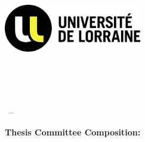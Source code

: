 \begin{titlepage}
    \begin{addmargin}[-1cm]{-3cm}
    \begin{center}
        \large  

        \hfill

        \vfill

        \begingroup
            \color{mypurple}\spacedallcaps{\myTitle} \\ \bigskip
        \endgroup

        \spacedlowsmallcaps{\myName}

        \vfill

        \includegraphics[width=6cm]{Assets/logo-ul.png} \\ \medskip

        \mySubtitle \\ \medskip   
        \myFaculty \\
        \myUni \\ \bigskip

        \myTime\ -- \myVersion

        \vfill
        
        \end{center}


        \vspace{1em}
        {\large\textbf{Thesis Committee Composition:}}


\end{addmargin}
\end{titlepage}
